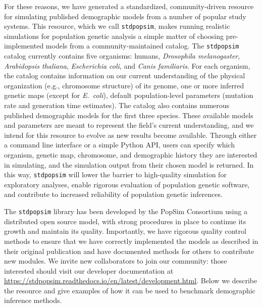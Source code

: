 \documentclass[12pt,halfline,a4paper]{ouparticle}
\newcommand{\stdpopsim}{\texttt{stdpopsim}\xspace}
\begin{document}
For these reasons, we have generated a standardized, community-driven resource
for simulating published demographic models from a number of popular study systems.
This resource, which we call \stdpopsim, makes running
realistic simulations for population genetic analysis a simple matter of
choosing pre-implemented models from a community-maintained catalog.
The \stdpopsim catalog currently contains five organisms: humans,
\textit{Drosophila melanogaster}, \textit{Arabidopsis thaliana},
\textit{Escherichia coli}, and \textit{Canis familiaris}.
For each organism, the catalog contains information on our current understanding of
the physical organization (e.g., chromosome structure) of its genome,
one or more inferred genetic maps (except for \textit{E.~coli}),
default population-level parameters (mutation rate and generation time estimates).
The catalog also contains numerous published demographic models for the first three species.
These available models and parameters are meant to represent the field's current understanding,
and we intend for this resource to evolve as new results become available.
Through either a command line interface or a simple Python API, users can specify which
organism, genetic map, chromosome, and demographic history they are interested in simulating, and the
simulation output from their chosen model is returned.
In this way, \stdpopsim will lower the barrier to high-quality simulation for exploratory analyses,
enable rigorous evaluation of population genetic software,
and contribute to increased reliability of population genetic inferences.


The \stdpopsim library has been developed by the PopSim Consortium using a
distributed open source model, with strong procedures in place
to continue its growth and maintain its quality.
Importantly, we have rigorous quality control methods to ensure that we have
correctly implemented the models as described in their original publication
and have documented methods for others to contribute new modules.
We invite new collaborators to join our community:
those interested should visit our developer documentation at
\url{https://stdpopsim.readthedocs.io/en/latest/development.html}.
Below we describe the resource and give
examples of how it can be used to benchmark demographic inference methods.
\end{document}
